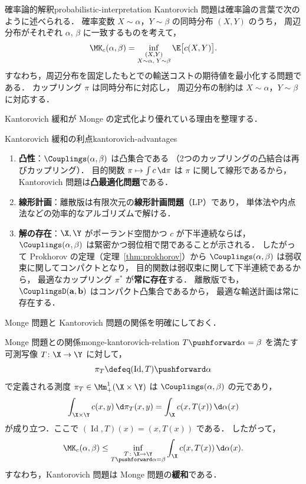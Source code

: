\begin{remark}{確率論的解釈}{probabilistic-interpretation}
  Kantorovich 問題は確率論の言葉で次のように述べられる．
  確率変数 $X \sim \alpha$，$Y \sim \beta$ の同時分布 $(X, Y)$ のうち，
  周辺分布がそれぞれ $\alpha$, $\beta$ に一致するものを考えて，
  \[
    \MK_c(\alpha, \beta) = \inf_{\substack{(X, Y) \\ X \sim \alpha,\; Y \sim \beta}}
    \E\bigl[c(X, Y)\bigr].
  \]
  すなわち，周辺分布を固定したもとでの輸送コストの期待値を最小化する問題である．
  カップリング $\pi$ は同時分布に対応し，
  周辺分布の制約は $X \sim \alpha$，$Y \sim \beta$ に対応する．
\end{remark}

Kantorovich 緩和が Monge の定式化より優れている理由を整理する．

\begin{remark}{Kantorovich 緩和の利点}{kantorovich-advantages}
  \begin{enumerate}
    \item \textbf{凸性}：$\Couplings(\alpha, \beta)$ は凸集合である
      （2つのカップリングの凸結合は再びカップリング）．
      目的関数 $\pi \mapsto \int c \, \d\pi$ は $\pi$ に関して線形であるから，
      Kantorovich 問題は\textbf{凸最適化問題}である．
    \item \textbf{線形計画}：離散版は有限次元の\textbf{線形計画問題}（LP）であり，
      単体法や内点法などの効率的なアルゴリズムで解ける．
    \item \textbf{解の存在}：$\X, \Y$ がポーランド空間かつ $c$ が下半連続ならば，
      $\Couplings(\alpha, \beta)$ は緊密かつ弱位相で閉であることが示される．
      したがって Prokhorov の定理（定理~\ref{thm:prokhorov}）から
      $\Couplings(\alpha, \beta)$ は弱収束に関してコンパクトとなり，
      目的関数は弱収束に関して下半連続であるから，
      最適なカップリング $\pi^*$ が\textbf{常に存在}する．
      離散版でも，$\CouplingsD(\mathbf{a}, \mathbf{b})$ はコンパクト凸集合であるから，
      最適な輸送計画は常に存在する．
  \end{enumerate}
\end{remark}

Monge 問題と Kantorovich 問題の関係を明確にしておく．

\begin{proposition}{Monge 問題との関係}{monge-kantorovich-relation}
  $T\pushforward \alpha = \beta$ を満たす可測写像 $T \colon \X \to \Y$ に対して，
  \[
    \pi_T \defeq (\operatorname{Id}, T)\pushforward \alpha
  \]
  で定義される測度 $\pi_T \in \Mm_+^1(\X \times \Y)$ は
  $\Couplings(\alpha, \beta)$ の元であり，
  \[
    \int_{\X \times \Y} c(x, y) \, \d\pi_T(x, y)
    = \int_\X c(x, T(x)) \, \d\alpha(x)
  \]
  が成り立つ．ここで $(\operatorname{Id}, T)(x) = (x, T(x))$ である．
  したがって，
  \[
    \MK_c(\alpha, \beta) \leq
    \inf_{\substack{T \colon \X \to \Y \\ T\pushforward \alpha = \beta}}
    \int_\X c(x, T(x)) \, \d\alpha(x).
  \]
  すなわち，Kantorovich 問題は Monge 問題の\textbf{緩和}である．
\end{proposition}

